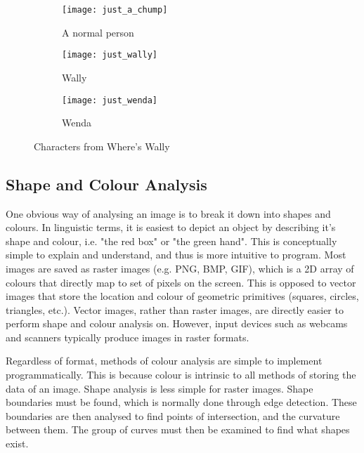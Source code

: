 \documentclass[../main.tex]{subfiles}
\begin{document}
    \begin{figure}[h]
    \centering
      \begin{subfigure}[b]{0.3\textwidth}
        \centering
        \texttt{[image: just\_a\_chump]}   
        \caption{A normal person}
        \label{justachump}
      \end{subfigure}
      \begin{subfigure}[b]{0.3\textwidth}
        \centering
        \texttt{[image: just\_wally]}   
        \caption{Wally}
        \label{justwally}
      \end{subfigure}
      \begin{subfigure}[b]{0.3\textwidth}
        \centering
        \texttt{[image: just\_wenda]}   
        \caption{Wenda}
        \label{justwenda}
      \end{subfigure}
    \caption{Characters from Where's Wally}
    \label{wallychars}
    \end{figure}
    \subsection{Shape and Colour Analysis}
    One obvious way of analysing an image is to break it down into shapes and colours.
    In linguistic terms, it is easiest to depict an object by describing it's shape and colour, i.e. "the red box" or "the green hand".
    This is conceptually simple to explain and understand, and thus is more intuitive to program.
    Most images are saved as raster images (e.g. PNG, BMP, GIF), which is a 2D array of colours that directly map to set of pixels on the screen.
    This is opposed to vector images that store the location and colour of geometric primitives (squares, circles, triangles, etc.).
    Vector images, rather than raster images, are directly easier to perform shape and colour analysis on.
    However, input devices such as webcams and scanners typically produce images in raster formats.

    Regardless of format, methods of colour analysis are simple to implement programmatically.
    This is because colour is intrinsic to all methods of storing the data of an image.
    Shape analysis is less simple for raster images.
    Shape boundaries must be found, which is normally done through edge detection.
    These boundaries are then analysed to find points of intersection, and the curvature between them.
    The group of curves must then be examined to find what shapes exist.
\end{document}
